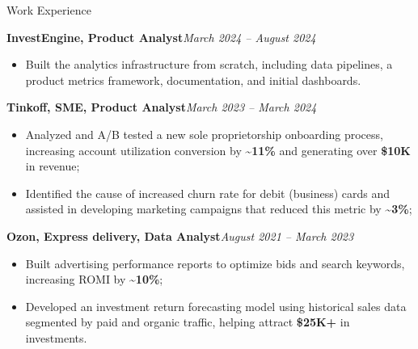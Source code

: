 \documentclass[]{mcdowellcv}
\renewenvironment{cvsubsection}[2]{%
  \begin{adjustwidth}{\subsectionmargin}{\subsectionmargin}%
    {\bfseries #1}\hfill #2\par\vspace{0.67em}%
}{%
  \end{adjustwidth}%
  \vspace*{\aftersubsectionspace}%
}
\begin{document}
\begin{cvsection}{\Large Work Experience}
        \begin{cvsubsection}{InvestEngine, Product Analyst}{\textit{March 2024 -- August 2024}}
            \begin{itemize}
                \item Built the analytics infrastructure from scratch, including data pipelines, a product metrics framework, documentation, and initial dashboards.
            \end{itemize}
        \end{cvsubsection}
		
		\begin{cvsubsection}{Tinkoff, SME, Product Analyst}{\textit{March 2023 -- March 2024}}
			\begin{itemize}
				\item Analyzed and A/B tested a new sole proprietorship onboarding process, increasing account utilization conversion by \textbf{\textasciitilde 11\%} and generating over \textbf{\$10K} in revenue;
				\item Identified the cause of increased churn rate for debit (business) cards and assisted in developing marketing campaigns that reduced this metric by \textbf{\textasciitilde 3\%};
			\end{itemize}
		\end{cvsubsection}
		
		\begin{cvsubsection}{Ozon, Express delivery, Data Analyst}{\textit{August 2021 -- March 2023}}
			\begin{itemize}
				\item Built advertising performance reports to optimize bids and search keywords, increasing ROMI by \textbf{\textasciitilde 10\%};
				\item Developed an investment return forecasting model using historical sales data segmented by paid and organic traffic, helping attract \textbf{\$25K+} in investments.
			\end{itemize}
		\end{cvsubsection}
	\end{cvsection}
	
\end{document}
